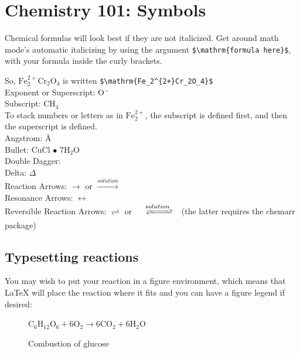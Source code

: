 \documentclass[12pt,twoside]{reedthesis}
\begin{document}


%




\section{Chemistry 101: Symbols}
Chemical formulas will look best if they are not italicized. Get around math mode's automatic italicizing by using the argument \verb=$\mathrm{formula here}$=, with your formula inside the curly brackets.

So, $\mathrm{Fe_2^{2+}Cr_2O_4}$ is written \verb=$\mathrm{Fe_2^{2+}Cr_2O_4}$=\\
Exponent or Superscript: O$^{-}$\\
Subscript: CH$_{4}$\\

To stack numbers or letters as in $\mathrm{Fe_2^{2+}}$, the subscript is defined first, and then the superscript is defined.\\
Angstrom: {\AA}\\
Bullet: CuCl $\bullet$ 7H${_2}$O\\
Double Dagger: \ddag \/\\
Delta: $\Delta$\\
Reaction Arrows: $\longrightarrow$ or  $\xrightarrow{solution}$\\
Resonance Arrows: $\leftrightarrow$\\
Reversible Reaction Arrows: $\rightleftharpoons$ or $\xrightleftharpoons[ ]{solution}$ (the latter requires the chemarr package)\\


\subsection{Typesetting reactions}
You may wish to put your reaction in a figure environment, which means that LaTeX will place the reaction where it fits and you can have a figure legend if desired:
\begin{figure}[htbp]
	\begin{center}
		$\mathrm{C_6H_{12}O_6  + 6O_2} \longrightarrow \mathrm{6CO_2 + 6H_2O}$
		\caption{Combustion of glucose}
		\label{combustion of glucose}
	\end{center}
\end{figure}
\end{document}
